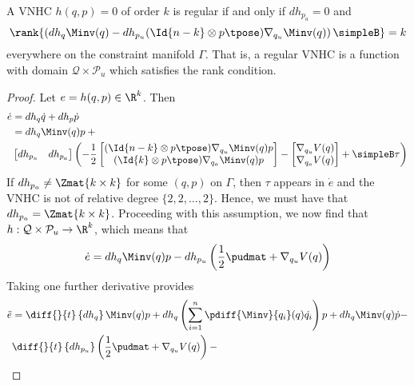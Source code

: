 \begin{thm}\label{thm:vnhc-regularity}
    A VNHC \(h(q,p) = 0\) of order \(k\) is regular if and only if \(dh_{p_a} = 0\) 
    and
    \[
        \rank{\left(dh_q \Minv(q) - 
          dh_{p_u} (\Id{n-k} \otimes p\tpose)\nabla_{q_u}\Minv(q) 
         \right)\simpleB} = k
    \]
    everywhere on the constraint manifold \(\Gamma\).
    That is, a regular VNHC is a function with domain 
    \(\mathcal{Q} \times \mathcal{P}_u\) which satisfies the rank condition.
\end{thm}
\begin{proof}
    Let \(e = h(q,p) \in \R^k\). Then 
    \begin{align*}
        \dot{e} &= dh_q \dot{q} + dh_p \dot{p} \\
                &= dh_q \Minv(q)p +{}  \\
            & \begin{bmatrix} dh_{p_u} & dh_{p_a} \end{bmatrix}
        \left( -\frac{1}{2} \begin{bmatrix}
            (\Id{n-k} \otimes p\tpose) \nabla_{q_u}\Minv(q)p \\
            (\Id{k} \otimes p\tpose) \nabla_{q_a}\Minv(q)p
            \end{bmatrix} - \begin{bmatrix}
            \nabla_{q_u}V(q) \\
            \nabla_{q_a}V(q)
        \end{bmatrix} + \simpleB \tau\right)
    \end{align*}
    If \(dh_{p_a} \neq \Zmat{k \times k}\) for some \((q,p)\) on \(\Gamma\), 
    then \(\tau\) appears in \(\dot{e}\) and the VNHC is not of relative degree
    \(\{2,2,\ldots,2\}\).
    Hence, we must have that \(dh_{p_a} = \Zmat{k \times k}\).
    Proceeding with this assumption, we now find that
    \(h : \mathcal{Q} \times \mathcal{P}_u \rightarrow \R^k\), which means that
    \[
        \dot{e} = dh_q \Minv(q)p - 
        dh_{p_u} \left(\frac{1}{2} \pudmat + \nabla_{q_u}V(q)\right)
    \]
    Taking one further derivative provides
    \begin{align*}
        \ddot{e} &= \diff{}{t}\left\{dh_q\right\}\Minv(q) p + 
        dh_q \left(\sum\limits_{i=1}^n \pdiff{\Minv}{q_i}(q)\dot{q_i}\right)p + 
        dh_q \Minv(q) \dot{p} - \\
         & \diff{}{t}\left\{dh_{p_u}\right\}
         \left(\frac{1}{2}\pudmat + \nabla_{q_u}V(q)\right) - \\

\end{align*}
\end{proof}
